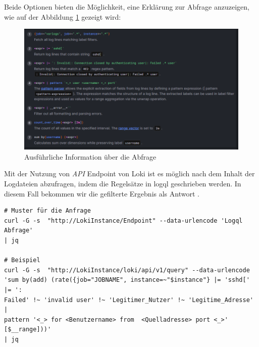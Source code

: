 \newpage
Beide Optionen bieten die Möglichkeit, eine Erklärung zur Abfrage anzuzeigen, wie auf der Abbildung \ref{fig:Loki_CodeInformation} gezeigt wird:
\begin{figure}[H]
   \centering
   \includegraphics[width=1\textwidth]{assets/erklaerungLoki.png}
   \caption[Ausführliche Information über die Abfrage]
   {Ausführliche Information über die Abfrage}
   \label{fig:Loki_CodeInformation}
   \centering
\end{figure}

Mit der Nutzung von \textit{\gls{API}} \gls{Endpoint} von Loki ist es möglich nach dem Inhalt der Logdateien abzufragen, indem die Regelsätze in \gls{logql} geschrieben werden. In diesem Fall bekommen wir die gefilterte Ergebnis als Antwort \citep{Grafana_api}.

{
\begin{Verbatim}[fontsize=\small, frame=single]
# Muster für die Anfrage
curl -G -s  "http://LokiInstance/Endpoint" --data-urlencode 'Logql Abfrage'
| jq

# Beispiel
curl -G -s  "http://LokiInstance/loki/api/v1/query" --data-urlencode
'sum by(add) (rate({job="JOBNAME", instance=~"$instance"} |= 'sshd[' |= ':
Failed' !~ 'invalid user' !~ 'Legitimer_Nutzer' !~ 'Legitime_Adresse' |
pattern '<_> for <Benutzername> from  <Quelladresse> port <_>' [$__range]))'
| jq
\end{Verbatim}
}

